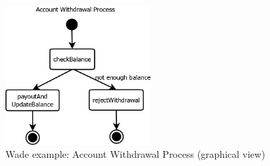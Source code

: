 \begin{figure}[h]
		\centering
		\includegraphics[width=0.5\textwidth]{images/wade_example.png}
		\caption{Wade example: Account Withdrawal Process (graphical view)}
	  \label{fig:wade_graph}
\end{figure}
\newpage
